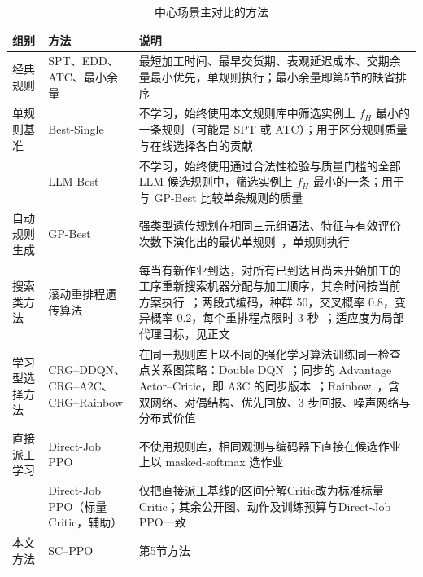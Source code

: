 \begin{table}[t]
  \centering
  \caption{中心场景主对比的方法}\label{tab:methods}
  \small
  \begin{tabular}{@{}>{\raggedright}p{2.4cm}>{\raggedright}p{3.3cm}>{\raggedright\arraybackslash}p{9.0cm}@{}}
    \toprule
    组别 & 方法 & 说明 \\
    \midrule
    经典规则 & SPT、EDD、ATC、最小余量 & 最短加工时间、最早交货期、表观延迟成本、交期余量最小优先，单规则执行；最小余量即第5节的缺省排序 \\
    单规则基准 & Best-Single & 不学习，始终使用本文规则库中筛选实例上 $f_H$ 最小的一条规则（可能是 SPT 或 ATC）；用于区分规则质量与在线选择各自的贡献 \\
     & LLM-Best & 不学习，始终使用通过合法性检验与质量门槛的全部 LLM 候选规则中，筛选实例上 $f_H$ 最小的一条；用于与 GP-Best 比较单条规则的质量 \\
    自动规则生成 & GP-Best & 强类型遗传规划在相同三元组语法、特征与有效评价次数下演化出的最优单规则~\cite{xu2022gp,xu2024gp}，单规则执行 \\
    搜索类方法 & 滚动重排程遗传算法 & 每当有新作业到达，对所有已到达且尚未开始加工的工序重新搜索机器分配与加工顺序，其余时间按当前方案执行~\cite{luo2022}；两段式编码，种群 50，交叉概率 0.8，变异概率 0.2，每个重排程点限时 3 秒~\cite{lu2024,fu2025}；适应度为局部代理目标，见正文 \\
    学习型选择方法 & CRG--DDQN、CRG--A2C、CRG--Rainbow & 在同一规则库上以不同的强化学习算法训练同一检查点关系图策略：Double DQN~\cite{vanhasselt2016}；同步的 Advantage Actor--Critic，即 A3C 的同步版本~\cite{mnih2016}；Rainbow~\cite{hessel2018}，含双网络、对偶结构、优先回放、3 步回报、噪声网络与分布式价值 \\
    直接派工学习 & Direct-Job PPO & 不使用规则库，相同观测与编码器下直接在候选作业上以 masked-softmax 选作业~\cite{song2023} \\
     & Direct-Job PPO（标量Critic，辅助） & 仅把直接派工基线的区间分解Critic改为标准标量Critic；其余公开图、动作及训练预算与Direct-Job PPO一致 \\
    本文方法 & SC--PPO & 第5节方法 \\
    \bottomrule
  \end{tabular}
\end{table}

